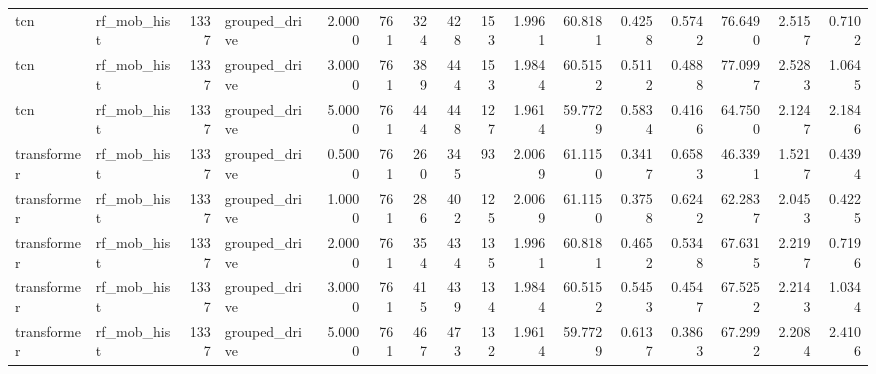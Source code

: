 \begin{tabular}{llrlrrrrrrrrrrrr}
tcn & rf\_mob\_hist & 1337 & grouped\_drive & 2.0000 & 761 & 324 & 428 & 153 & 1.9961 & 60.8181 & 0.4258 & 0.5742 & 76.6490 & 2.5157 & 0.7102 \\
tcn & rf\_mob\_hist & 1337 & grouped\_drive & 3.0000 & 761 & 389 & 444 & 153 & 1.9844 & 60.5152 & 0.5112 & 0.4888 & 77.0997 & 2.5283 & 1.0645 \\
tcn & rf\_mob\_hist & 1337 & grouped\_drive & 5.0000 & 761 & 444 & 448 & 127 & 1.9614 & 59.7729 & 0.5834 & 0.4166 & 64.7500 & 2.1247 & 2.1846 \\
transformer & rf\_mob\_hist & 1337 & grouped\_drive & 0.5000 & 761 & 260 & 345 & 93 & 2.0069 & 61.1150 & 0.3417 & 0.6583 & 46.3391 & 1.5217 & 0.4394 \\
transformer & rf\_mob\_hist & 1337 & grouped\_drive & 1.0000 & 761 & 286 & 402 & 125 & 2.0069 & 61.1150 & 0.3758 & 0.6242 & 62.2837 & 2.0453 & 0.4225 \\
transformer & rf\_mob\_hist & 1337 & grouped\_drive & 2.0000 & 761 & 354 & 434 & 135 & 1.9961 & 60.8181 & 0.4652 & 0.5348 & 67.6315 & 2.2197 & 0.7196 \\
transformer & rf\_mob\_hist & 1337 & grouped\_drive & 3.0000 & 761 & 415 & 439 & 134 & 1.9844 & 60.5152 & 0.5453 & 0.4547 & 67.5252 & 2.2143 & 1.0344 \\
transformer & rf\_mob\_hist & 1337 & grouped\_drive & 5.0000 & 761 & 467 & 473 & 132 & 1.9614 & 59.7729 & 0.6137 & 0.3863 & 67.2992 & 2.2084 & 2.4106 \\
\bottomrule
\end{tabular}
